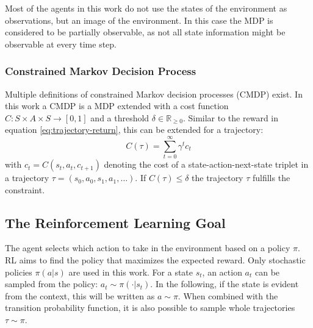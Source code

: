 Most of the agents in this work do not use the states of the environment as observations, but an image of the environment. In this case the MDP is considered to be partially observable, as not all state information might be observable at every time step.


\subsubsection{Constrained Markov Decision Process}
\label{sec:preliminaries:rl:cmdp}

Multiple definitions of constrained Markov decision processes (CMDP) exist. In this work a CMDP is a MDP extended with a cost function $C:S\times A\times S \rightarrow [0,1]$ and a threshold $\delta \in \mathbb{R}_{\geq 0}$.
Similar to the reward in equation \ref{eq:trajectory-return}, this can be extended for a trajectory:
\begin{equation}
    C(\tau) = \sum^\infty_{t=0} \gamma^t c_t
    \label{eq:trajectory-cost}
\end{equation}
with $c_t = C(s_t,a_t,c_{t+1})$ denoting the cost of a state-action-next-state triplet in a trajectory $\tau = (s_0, a_0, s_1, a_1, \dots)$.
If $C(\tau) \leq \delta$ the trajectory $\tau$ fulfills the constraint.

\subsection{The Reinforcement Learning Goal}
\label{sec:preliminaries:rl:rl-goal}

The agent selects which action to take in the environment based on a policy $\pi$. RL aims to find the policy that maximizes the expected reward. Only stochastic policies $\pi(a|s)$ are used in this work. For a state $s_t$, an action $a_t$ can be sampled from the policy: $a_t \sim \pi(\cdot|s_t)$. In the following, if the state is evident from the context, this will be written as $a\sim\pi$. When combined with the transition probability function, it is also possible to sample whole trajectories $\tau\sim\pi$.

